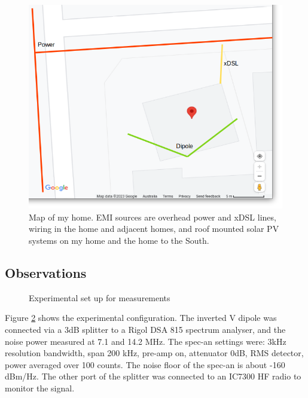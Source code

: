 \documentclass{article}
\begin{document}
\begin{figure}[h]
\caption{Map of my home.  EMI sources are overhead power and xDSL lines, wiring in the home and adjacent homes, and roof mounted solar PV systems on my home and the home to the South.}
\label{fig:home_map}
\begin{center}
\includegraphics[width=12cm]{house_map.png}
\end{center}
\end{figure}

\subsection{Observations}

\begin{figure}[h]
\caption{Experimental set up for measurements}
\label{fig:meas_config_1}
\begin{center}
\end{center}
\end{figure}

Figure \ref{fig:meas_config_1} shows the experimental configuration. The inverted V dipole was connected via a 3dB splitter to a Rigol DSA 815 spectrum analyser, and the noise power measured at 7.1 and 14.2 MHz.  The spec-an settings were: 3kHz resolution bandwidth, span 200 kHz, pre-amp on, attenuator 0dB, RMS detector, power averaged over 100 counts.  The noise floor of the spec-an is about -160 dBm/Hz. The other port of the splitter was connected to an IC7300 HF radio to monitor the signal.
\end{document}
